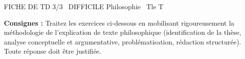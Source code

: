 \documentclass[11pt]{article}
\begin{document}
\begin{tcolorbox}[enhanced,colback=popink,colframe=popink,arc=10pt,boxrule=0pt,left=12pt,right=12pt,top=9pt,bottom=9pt]
{\color{white}\popxbold\small FICHE DE TD 3/3 \textbullet\ DIFFICILE \hfill Philosophie \textbullet\ Tle T\par}
\end{tcolorbox}
\vspace{4pt}
\noindent \textbf{Consignes :} Traitez les exercices ci-dessous en mobilisant rigoureusement la méthodologie de l'explication de texte philosophique (identification de la thèse, analyse conceptuelle et argumentative, problématisation, rédaction structurée). Toute réponse doit être justifiée.
\end{document}
